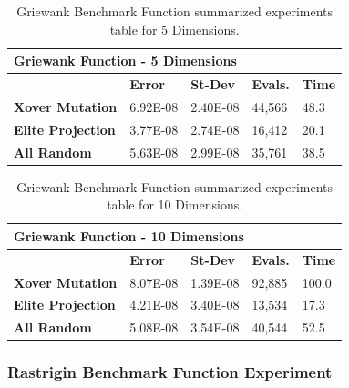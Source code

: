 \documentclass[graybox]{svmult}
\begin{document}
            \begin{table}[]
                \scriptsize
                \centering
                \caption{Griewank Benchmark Function summarized experiments table for 5 Dimensions.}\label{tab.fun_griewank5}
                \begin{tabular}{@{}lllll@{}}
                \toprule
                \multicolumn{5}{l}{\textbf{Griewank Function - 5 Dimensions}} \\ \midrule
                & \textbf{Error} & \textbf{St-Dev} & \textbf{Evals.} & \textbf{Time} \\
                \textbf{Xover Mutation} & 6.92E-08 & 2.40E-08 & 44,566 & 48.3 \\
                \textbf{Elite Projection} & 3.77E-08 & 2.74E-08 & 16,412 & 20.1 \\
                \textbf{All Random} & 5.63E-08 & 2.99E-08 & 35,761 & 38.5 \\ \bottomrule
                \end{tabular}
                \end{table}

            \begin{table}[]
                \scriptsize
                \centering
                \caption{Griewank Benchmark Function summarized experiments table for 10 Dimensions.}\label{tab.fun_griewank10}
                \begin{tabular}{@{}lllll@{}}
                \toprule
                \multicolumn{5}{l}{\textbf{Griewank Function - 10 Dimensions}} \\ \midrule
                & \textbf{Error} & \textbf{St-Dev} & \textbf{Evals.} & \textbf{Time} \\
                \textbf{Xover Mutation} & 8.07E-08 & 1.39E-08 & 92,885 & 100.0 \\
                \textbf{Elite Projection} & 4.21E-08 & 3.40E-08 & 13,534 & 17.3 \\
                \textbf{All Random} & 5.08E-08 & 3.54E-08 & 40,544 & 52.5 \\ \bottomrule
                \end{tabular}
                \end{table}


        \subsubsection{Rastrigin Benchmark Function Experiment}
\end{document}
